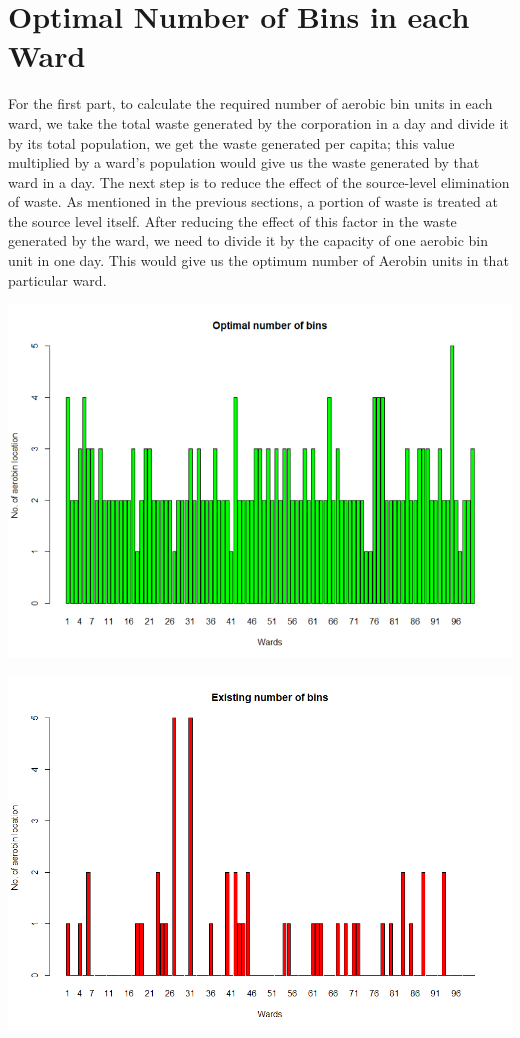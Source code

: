\documentclass[12pt,a4paper]{report}
\begin{document}
\section{Optimal Number of Bins in each Ward}
\begin{justify}
	For the first part, to calculate the required number of aerobic bin units in each ward, we take the total waste generated by the corporation in a day and divide it by its total population, we get the waste generated per capita; this value multiplied by a ward’s population would give us the waste generated by that ward in a day. The next step is to reduce the effect of the source-level elimination of waste. As mentioned in the previous sections, a portion of waste is treated at the source level itself. After reducing the effect of this factor in the waste generated by the ward, we need to divide it by the capacity of one aerobic bin unit in one day. This would give us the optimum number of Aerobin units in that particular ward.
	
	\includegraphics[width=1\textwidth]{opt}
	
	\includegraphics[width=1\textwidth]{exis}
	


\end{justify}
\end{document}
